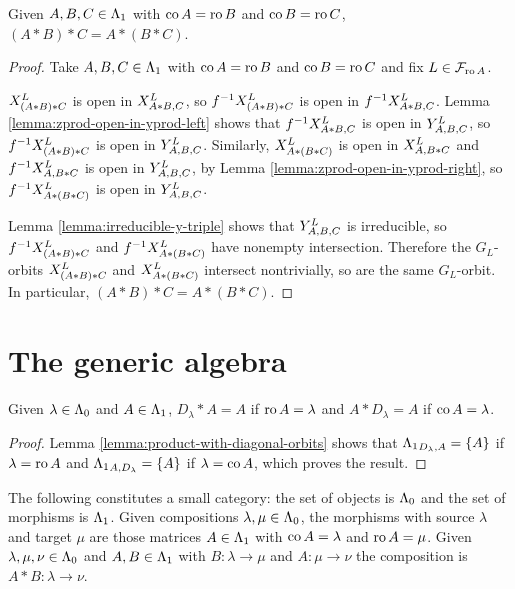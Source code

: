 \documentclass[a4paper, 11pt]{report}
\begin{document}
\begin{proposition}\label{proposition:associativity}
Given $A,B,C\in\matrices$ with $\co{A}=\ro{B}$ and $\co{B}=\ro{C}$, $(A\ast B)\ast C = A\ast (B\ast C)$.
\end{proposition}

\begin{proof}
Take $A,B,C\in\matrices$ with $\co{A}=\ro{B}$ and $\co{B}=\ro{C}$ and fix $L\in\flags_{\ro{A}}$.

$\xprod[L]{(A\ast B)\ast C}$ is open in $\xprod[L]{A\ast B,C}$, so $f^{-1}\xprod[L]{(A\ast B)\ast C}$ is open in $f^{-1}\xprod[L]{A\ast B,C}$. Lemma \ref{lemma:zprod-open-in-yprod-left} shows that $f^{-1}\xprod[L]{A\ast B,C}$ is open in $\yprod[L]{A,B,C}$, so $f^{-1}\xprod[L]{(A\ast B)\ast C}$ is open in $\yprod[L]{A,B,C}$. Similarly, $\xprod[L]{A\ast(B\ast C)}$ is open in $\xprod[L]{A,B\ast C}$ and $f^{-1}\xprod[L]{A,B\ast C}$ is open in $\yprod[L]{A,B,C}$, by Lemma \ref{lemma:zprod-open-in-yprod-right}, so $f^{-1}\xprod[L]{A\ast(B\ast C)}$ is open in $\yprod[L]{A,B,C}$.

Lemma \ref{lemma:irreducible-y-triple} shows that $\yprod[L]{A,B,C}$ is irreducible, so $f^{-1}\xprod[L]{(A\ast B)\ast C}$ and $f^{-1}\xprod[L]{A\ast(B\ast C)}$ have nonempty intersection. Therefore the $G_L$-orbits $\xprod[L]{(A\ast B)\ast C}$ and $\xprod[L]{A\ast(B\ast C)}$ intersect nontrivially, so are the same $G_L$-orbit. In particular, $(A\ast B)\ast C= A\ast(B\ast C)$. 
\end{proof}


\section{The generic algebra}

\begin{lemma}\label{lemma:identity-morphisms}
Given $\lambda\in\compositions$ and $A\in\matrices$, $D_\lambda\ast A = A$ if $\ro{A}=\lambda$ and $A\ast D_\lambda = A$ if $\co{A}=\lambda$.
\end{lemma}
\begin{proof}
Lemma \ref{lemma:product-with-diagonal-orbits} shows that $\matrices_{D_\lambda,A} = \{A\}$ if $\lambda=\ro{A}$ and $\matrices_{A,D_\lambda} = \{A\}$ if $\lambda=\co{A}$, which proves the result. 
\end{proof}

\begin{theorem}\label{thm:generic-category}
The following constitutes a small category: the set of objects is $\compositions$ and the set of morphisms is $\matrices$. Given compositions $\lambda,\mu\in\compositions$, the morphisms with source $\lambda$ and target $\mu$ are those matrices $A\in\matrices$ with $\co{A}=\lambda$ and $\ro{A}=\mu$. Given $\lambda,\mu,\nu\in\compositions$ and $A,B\in\matrices$ with $B\colon\lambda\to\mu$ and $A\colon\mu\to\nu$ the composition is $A\ast B\colon\lambda\to\nu$.
\end{theorem}
\end{document}
